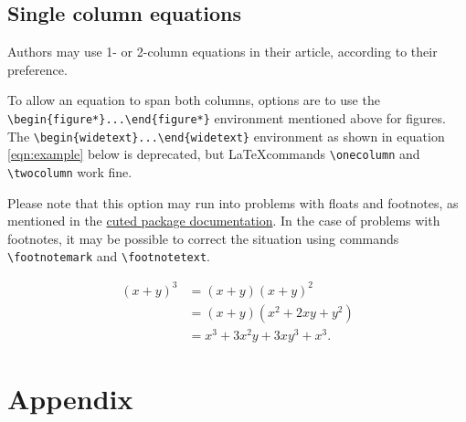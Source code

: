 \documentclass[letterpaper,9pt,twocolumn,twoside,]{pinp}
\begin{document}
\hypertarget{single-column-equations}{%
\subsection{Single column equations}\label{single-column-equations}}

Authors may use 1- or 2-column equations in their article, according to
their preference.

To allow an equation to span both columns, options are to use the
\texttt{\textbackslash{}begin\{figure*\}...\textbackslash{}end\{figure*\}}
environment mentioned above for figures. The
\texttt{\textbackslash{}begin\{widetext\}...\textbackslash{}end\{widetext\}}
environment as shown in equation \ref{eqn:example} below is deprecated,
but \LaTeX commands \texttt{\textbackslash{}onecolumn} and
\texttt{\textbackslash{}twocolumn} work fine.

Please note that this option may run into problems with floats and
footnotes, as mentioned in the \href{http://texdoc.net/pkg/cuted}{cuted
package documentation}. In the case of problems with footnotes, it may
be possible to correct the situation using commands
\texttt{\textbackslash{}footnotemark} and
\texttt{\textbackslash{}footnotetext}.

\begin{equation}
  \begin{aligned}
(x+y)^3&=(x+y)(x+y)^2\\
       &=(x+y)(x^2+2xy+y^2) \\
       &=x^3+3x^2y+3xy^3+x^3. 
       \label{eqn:example} 
  \end{aligned}
\end{equation}

\hypertarget{appendix}{%
\section{Appendix}\label{appendix}}
\end{document}
